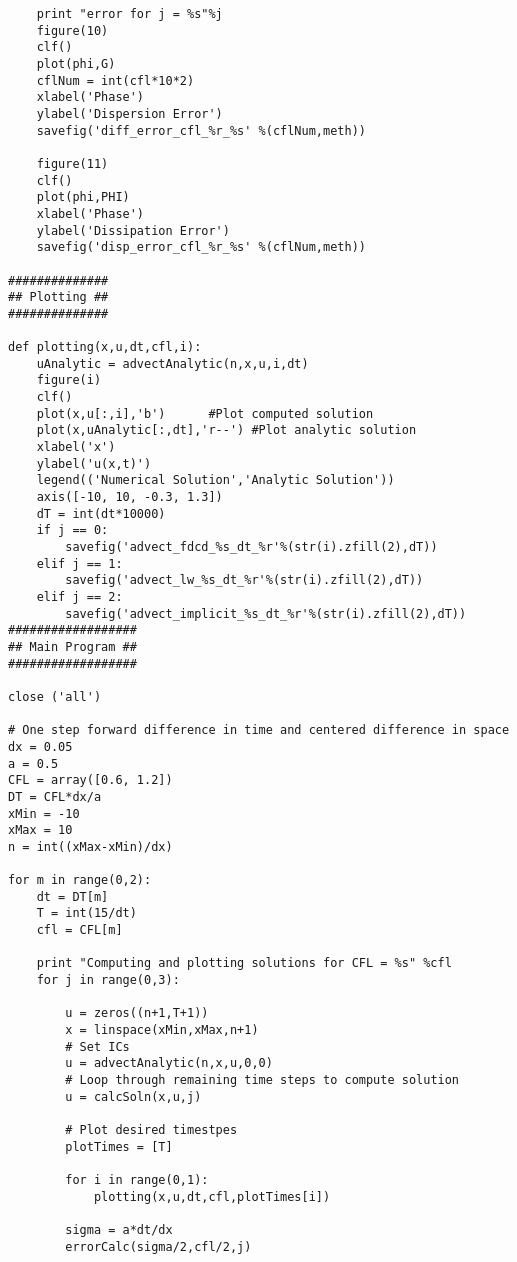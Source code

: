 \documentclass[a4paper,12pt,titlepage]{article}
\begin{document}
\begin{verbatim}
    print "error for j = %s"%j
    figure(10)
    clf()
    plot(phi,G)
    cflNum = int(cfl*10*2)
    xlabel('Phase')
    ylabel('Dispersion Error')
    savefig('diff_error_cfl_%r_%s' %(cflNum,meth))

    figure(11)
    clf()
    plot(phi,PHI)
    xlabel('Phase')
    ylabel('Dissipation Error')
    savefig('disp_error_cfl_%r_%s' %(cflNum,meth))              
                 
##############
## Plotting ##
##############

def plotting(x,u,dt,cfl,i):
    uAnalytic = advectAnalytic(n,x,u,i,dt)
    figure(i)
    clf()
    plot(x,u[:,i],'b')      #Plot computed solution
    plot(x,uAnalytic[:,dt],'r--') #Plot analytic solution
    xlabel('x')
    ylabel('u(x,t)')
    legend(('Numerical Solution','Analytic Solution'))
    axis([-10, 10, -0.3, 1.3])
    dT = int(dt*10000)
    if j == 0:
        savefig('advect_fdcd_%s_dt_%r'%(str(i).zfill(2),dT))
    elif j == 1:
        savefig('advect_lw_%s_dt_%r'%(str(i).zfill(2),dT))
    elif j == 2:
        savefig('advect_implicit_%s_dt_%r'%(str(i).zfill(2),dT))
##################
## Main Program ##
##################

close ('all')

# One step forward difference in time and centered difference in space
dx = 0.05
a = 0.5
CFL = array([0.6, 1.2])
DT = CFL*dx/a
xMin = -10
xMax = 10
n = int((xMax-xMin)/dx)

for m in range(0,2):
    dt = DT[m]
    T = int(15/dt)
    cfl = CFL[m]

    print "Computing and plotting solutions for CFL = %s" %cfl
    for j in range(0,3):

        u = zeros((n+1,T+1))
        x = linspace(xMin,xMax,n+1)
        # Set ICs
        u = advectAnalytic(n,x,u,0,0)
        # Loop through remaining time steps to compute solution
        u = calcSoln(x,u,j)

        # Plot desired timestpes
        plotTimes = [T]
    
        for i in range(0,1):
            plotting(x,u,dt,cfl,plotTimes[i])
        
        sigma = a*dt/dx
        errorCalc(sigma/2,cfl/2,j)    

\end{verbatim}
\end{document}
